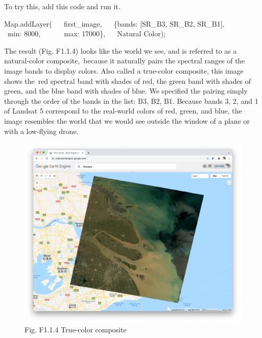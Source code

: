 \documentclass[
  letterpaper,
  DIV=11,
  numbers=noendperiod]{scrreprt}
\newenvironment{Shaded}{\begin{snugshade}}{\end{snugshade}}
\newcommand{\BuiltInTok}[1]{\textcolor[rgb]{0.00,0.23,0.31}{#1}}
\newcommand{\DataTypeTok}[1]{\textcolor[rgb]{0.68,0.00,0.00}{#1}}
\newcommand{\DecValTok}[1]{\textcolor[rgb]{0.68,0.00,0.00}{#1}}
\newcommand{\FunctionTok}[1]{\textcolor[rgb]{0.28,0.35,0.67}{#1}}
\newcommand{\NormalTok}[1]{\textcolor[rgb]{0.00,0.23,0.31}{#1}}
\newcommand{\OperatorTok}[1]{\textcolor[rgb]{0.37,0.37,0.37}{#1}}
\newcommand{\StringTok}[1]{\textcolor[rgb]{0.13,0.47,0.30}{#1}}
\begin{document}
To try this, add this code and run it.

\begin{Shaded}
\begin{Highlighting}[]
\BuiltInTok{Map}\OperatorTok{.}\FunctionTok{addLayer}\NormalTok{(  }
\NormalTok{   first\_image}\OperatorTok{,}  
\NormalTok{   \{}\DataTypeTok{bands}\OperatorTok{:}\NormalTok{ [}\StringTok{\textquotesingle{}SR\_B3\textquotesingle{}}\OperatorTok{,} \StringTok{\textquotesingle{}SR\_B2\textquotesingle{}}\OperatorTok{,} \StringTok{\textquotesingle{}SR\_B1\textquotesingle{}}\NormalTok{]}\OperatorTok{,}  
      \DataTypeTok{ min}\OperatorTok{:} \DecValTok{8000}\OperatorTok{,}  
      \DataTypeTok{ max}\OperatorTok{:} \DecValTok{17000}\NormalTok{\}}\OperatorTok{,}   
    \StringTok{\textquotesingle{}Natural Color\textquotesingle{}}\NormalTok{)}\OperatorTok{;}
\end{Highlighting}
\end{Shaded}

The result (Fig. F1.1.4) looks like the world we see, and is referred to
as a natural-color composite,~because it naturally pairs the spectral
ranges of the image bands to display colors. Also called a true-color
composite, this image shows the~red spectral band with shades of red,
the green band with shades of green, and the blue band with shades of
blue. We specified the pairing simply through the order of the bands in
the list: B3, B2, B1. Because bands 3, 2, and 1 of Landsat 5 correspond
to the real-world colors of red, green, and blue, the image resembles
the world that we would see outside the window of a plane or with a
low-flying drone. ~

\begin{figure}

{\centering \includegraphics{./F1/image39.png}

}

\caption{Fig. F1.1.4 True-color composite}

\end{figure}
\end{document}
